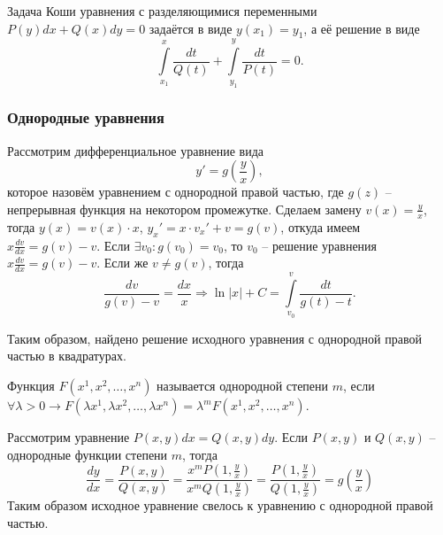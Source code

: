 \begin{proposition}
    Задача Коши уравнения с разделяющимися переменными $P(y)dx + Q(x)dy = 0$ задаётся в виде $y(x_1) = y_1$, а её решение в виде 
    \begin{equation}
        \int\limits_{x_1}^{x} \frac{dt}{Q(t)} + \int\limits_{y_1}^{y} \frac{dt}{P(t)} = 0.
    \end{equation}
\end{proposition}

\subsubsection{Однородные уравнения}

Рассмотрим дифференциальное уравнение вида
\[ y' = g \left( \frac{y}{x} \right), \]
которое назовём уравнением с однородной правой частью, где $g(z)$ -- непрерывная функция на некотором промежутке. Сделаем замену $v(x) = \frac{y}{x}$, тогда $y(x) = v(x) \cdot x$, $y_x' = x \cdot v_x' + v = g(v)$, откуда имеем $x \frac{dv}{dx} = g(v) - v$. Если $\exists v_0: g(v_0) = v_0$, то $v_0$ -- решение уравнения $x \frac{dv}{dx} = g(v) - v$. Если же $v \neq g(v)$, тогда
\begin{equation}
    \frac{dv}{g(v) - v} = \frac{dx}{x} \Rightarrow \ln |x| + C = \int\limits_{v_0}^{v} \frac{dt}{g(t) - t}.
\end{equation}

Таким образом, найдено решение исходного уравнения с однородной правой частью в квадратурах.

\begin{definition}
    Функция $F(x^1, x^2, \dots, x^n)$ называется однородной степени $m$, если $\forall \lambda > 0 \longrightarrow F(\lambda x^1, \lambda x^2, \dots,  \lambda x^n) = \lambda^m F(x^1, x^2, \dots, x^n)$.
\end{definition}

\begin{example}
    Рассмотрим уравнение $P(x, y) dx = Q(x, y) dy$. Если $P(x, y)$ и $Q(x, y)$ -- однородные функции степени $m$, тогда
    \begin{equation}
        \frac{dy}{dx} = \frac{P(x, y)}{Q(x, y)} = \frac{x^m P(1, \frac{y}{x})}{x^m Q(1, \frac{y}{x})} = \frac{P(1, \frac{y}{x})}{Q(1, \frac{y}{x})} = g \left( \frac{y}{x} \right)
    \end{equation}
    Таким образом исходное уравнение свелось к уравнению с однородной правой частью.
\end{example}

